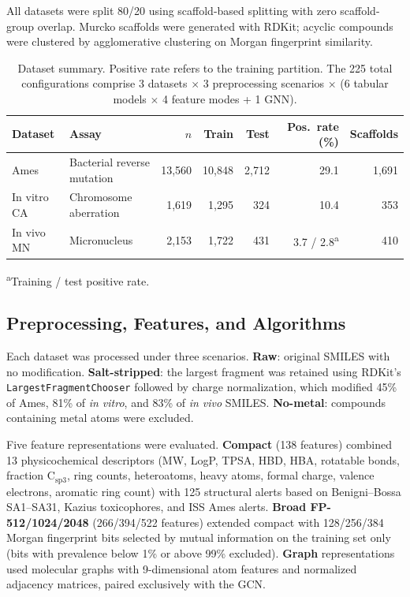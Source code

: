 All datasets were split 80/20 using scaffold-based splitting\cite{Sheridan_2013} with zero 
scaffold-group overlap. Murcko scaffolds\cite{Bemis_Murcko_1996} were generated with 
RDKit;\cite{RDKit} acyclic compounds were clustered by agglomerative clustering on Morgan 
fingerprint\cite{Rogers_Hahn_2010} similarity.

\begin{table}[ht]
\caption{Dataset summary. Positive rate refers to the training partition. The 225 total 
configurations comprise 3 datasets $\times$ 3 preprocessing scenarios $\times$ (6 tabular 
models $\times$ 4 feature modes + 1 GNN).}
\label{tab:datasets}
\centering
\small
\begin{tabular}{@{}llrrrrr@{}}
\toprule
Dataset & Assay & $n$ & Train & Test & Pos.\ rate (\%) & Scaffolds \\
\midrule
Ames       & Bacterial reverse mutation & 13,560 & 10,848 & 2,712 & 29.1             & 1,691 \\
In vitro CA & Chromosome aberration     &  1,619 &  1,295 &   324 & 10.4             &   353 \\
In vivo MN  & Micronucleus              &  2,153 &  1,722 &   431 & 3.7 / 2.8\textsuperscript{a} & 410 \\
\bottomrule
\end{tabular}

\medskip
\footnotesize
\textsuperscript{a}Training / test positive rate.
\end{table}

\subsection{Preprocessing, Features, and Algorithms}

Each dataset was processed under three scenarios. \textbf{Raw}: original SMILES with no 
modification. \textbf{Salt-stripped}: the largest fragment was retained using RDKit's 
\texttt{LargestFragmentChooser}\cite{RDKit} followed by charge normalization, which 
modified 45\% of Ames, 81\% of \textit{in vitro}, and 83\% of \textit{in vivo} SMILES. \textbf{No-metal}: 
compounds containing metal atoms were excluded.

Five feature representations were evaluated. \textbf{Compact} (138 features) combined 13 
physicochemical descriptors (MW, LogP, TPSA, HBD, HBA, rotatable bonds, fraction 
$\mathrm{C_{sp3}}$, ring counts, heteroatoms, heavy atoms, formal charge, valence electrons, 
aromatic ring count) with 125 structural alerts based on Benigni--Bossa 
SA1--SA31,\cite{Benigni_Bossa_2008,Benigni_2013} Kazius toxicophores,\cite{Kazius_2005} and 
ISS Ames alerts. \textbf{Broad FP-512/1024/2048} (266/394/522 features) extended compact 
with 128/256/384 Morgan fingerprint bits\cite{Rogers_Hahn_2010} selected by mutual 
information\cite{Kraskov_2004} on the training set only (bits with prevalence below 1\% or 
above 99\% excluded). \textbf{Graph} representations used molecular graphs with 9-dimensional 
atom features and normalized adjacency matrices, paired exclusively with the GCN.

